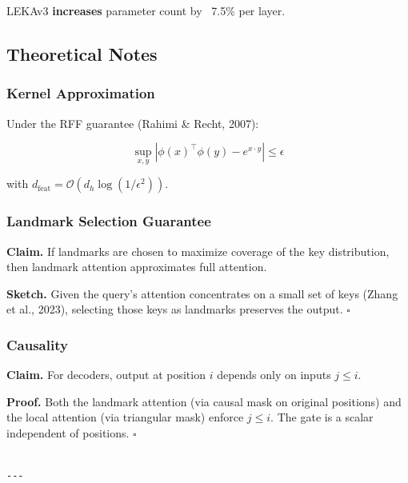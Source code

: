 LEKAv3 \textbf{increases} parameter count by ~7.5\% per layer.

\subsection{Theoretical Notes}

\subsubsection{Kernel Approximation}

Under the RFF guarantee (Rahimi \& Recht, 2007):

\[
\sup_{x, y} |\phi(x)^\top \phi(y) - e^{x \cdot y}| \leq \epsilon
\tag{4.17}
\]

with $d_\text{feat} = \mathcal{O}(d_h \log(1/\epsilon^2))$.

\subsubsection{Landmark Selection Guarantee}

\textbf{Claim.} If landmarks are chosen to maximize coverage of the key 
distribution, then landmark attention approximates full attention.

\textbf{Sketch.} Given the query's attention concentrates on a small set of 
keys (Zhang et al., 2023), selecting those keys as landmarks preserves 
the output. $\square$

\subsubsection{Causality}

\textbf{Claim.} For decoders, output at position $i$ depends only on inputs 
$j \leq i$.

\textbf{Proof.} Both the landmark attention (via causal mask on original 
positions) and the local attention (via triangular mask) enforce $j \leq i$. 
The gate is a scalar independent of positions. $\square$
\begin{lstlisting}

---
\end{lstlisting}